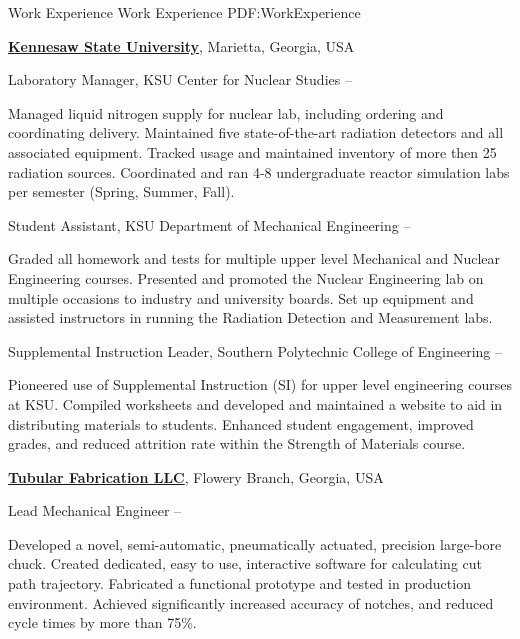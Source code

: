 \documentclass[letterpaper,MMMyyyy,nonstopmode]{resume}
\begin{document}
\begin{Body}

\Section
{Work Experience}
{Work Experience}
{PDF:WorkExperience}

\Entry
\href{http://kennesaw.edu/}
{\textbf{Kennesaw State University}},
Marietta, Georgia, USA

\Gap
\BulletItem
Laboratory Manager,
KSU Center for Nuclear Studies
\hfill
{} --
\begin{Detail}
\SubBulletItem
Managed liquid nitrogen supply for nuclear lab, including ordering and coordinating delivery.
\SubBulletItem
Maintained five state-of-the-art radiation detectors and all associated equipment.
\SubBulletItem
Tracked usage and maintained inventory of more then 25 radiation sources.
\SubBulletItem
Coordinated and ran 4-8 undergraduate reactor simulation labs per semester (Spring, Summer, Fall).
\end{Detail}

\Gap
\BulletItem
Student Assistant,
KSU Department of Mechanical Engineering
\hfill
{} --
\begin{Detail}
\SubBulletItem
Graded all homework and tests for multiple upper level Mechanical and Nuclear Engineering courses.
\SubBulletItem
Presented and promoted the Nuclear Engineering lab on multiple occasions to industry and university boards.
\SubBulletItem
Set up equipment and assisted instructors in running the Radiation Detection and Measurement labs.
\end{Detail}

\Gap
\BulletItem
Supplemental Instruction Leader,
Southern Polytechnic College of Engineering
\hfill
{} --
\begin{Detail}
\SubBulletItem
Pioneered use of Supplemental Instruction (SI) for upper level engineering courses at KSU.
\SubBulletItem
Compiled worksheets and developed and maintained a website to aid in distributing materials to students.
\SubBulletItem
Enhanced student engagement, improved grades, and reduced attrition rate within the Strength of Materials course.
\end{Detail}


\BigGap
\Entry
\href{http://tubularfab.com}
{\textbf{Tubular Fabrication LLC}},
Flowery Branch, Georgia, USA

\Gap
\BulletItem
Lead Mechanical Engineer
\hfill
{} --
\begin{Detail}
\SubBulletItem
Developed a novel, semi-automatic, pneumatically actuated, precision large-bore chuck.
\SubBulletItem
Created dedicated, easy to use, interactive software for calculating cut path trajectory.
\SubBulletItem
Fabricated a functional prototype and tested in production environment.
\SubBulletItem
Achieved significantly increased accuracy of notches, and reduced cycle times by more than 75\%.
\end{Detail}



\end{Body}
\end{document}
